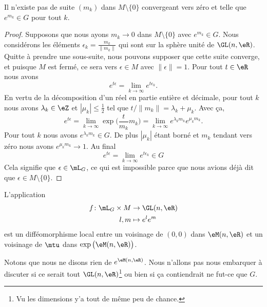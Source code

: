 \begin{lemma}   \label{LemHOsbREC}
	Il n'existe pas de suite \( (m_k)\) dans \( M\setminus\{ 0 \}\) convergeant vers zéro et telle que \(  e^{m_k}\in G\) pour tout \( k\).
\end{lemma}

\begin{proof}
	Supposons que nous ayons \( m_k\to 0\) dans \( M\setminus\{ 0 \}\) avec \(  e^{m_k}\in G\). Nous considérons les éléments \( \epsilon_k=\frac{ m_k }{ \| m_k \| }\) qui sont sur la sphère unité de \(\GL(n,\eR)\). Quitte à prendre une sous-suite, nous pouvons supposer que cette suite converge, et puisque \( M\) est fermé, ce sera vers \( \epsilon\in M\) avec \( \| \epsilon \|=1\). Pour tout \( t\in \eR\) nous avons
	\begin{equation}
		e^{t\epsilon}=\lim_{k\to \infty}  e^{t\epsilon_k}.
	\end{equation}
	En vertu de la décomposition d'un réel en partie entière et décimale, pour tout \( k\) nous avons \( \lambda_k\in \eZ\) et \( | \mu_k |\leq \frac{ 1 }{2}\) tel que \( t/\| m_k \|=\lambda_k+\mu_k\). Avec ça,
	\begin{equation}
		e^{t\epsilon}=\lim_{k\to \infty}\exp\Big( \frac{ t }{ m_k }m_k \Big)=\lim_{k\to \infty}  e^{\lambda_km_k} e^{\mu_km_k}.
	\end{equation}
	Pour tout \( k\) nous avons \(  e^{\lambda_km_k}\in G\). De plus \( | \mu_k |\) étant borné et \( m_k\) tendant vers zéro nous avons \(  e^{\mu_km_k}\to 1\). Au final
	\begin{equation}
		e^{t\epsilon}=\lim_{k\to \infty}  e^{t\epsilon_k}\in G
	\end{equation}
	Cela signifie que \( \epsilon\in\mL_G\), ce qui est impossible parce que nous avions déjà dit que \( \epsilon\in M\setminus\{ 0 \}\).
\end{proof}

\begin{lemma}   \label{LemGGTtxdF}
	L'application
	\begin{equation}
		\begin{aligned}
			f\colon \mL_G\times M & \to \GL(n,\eR)       \\
			l,m                   & \mapsto  e^{l} e^{m}
		\end{aligned}
	\end{equation}
	est un difféomorphisme local entre un voisinage de \( (0,0)\) dans \( \eM(n,\eR)\) et un voisinage de \( \mtu\) dans \( \exp\big( \eM(n,\eR) \big)\).
\end{lemma}
Notons que nous ne disons rien de \(  e^{\eM(n,\eR)}\). Nous n'allons pas nous embarquer à discuter si ce serait tout \( \GL(n,\eR)\)\footnote{Vu les dimensions y'a tout de même peu de chance.} ou bien si ça contiendrait ne fut-ce que \( G\).

